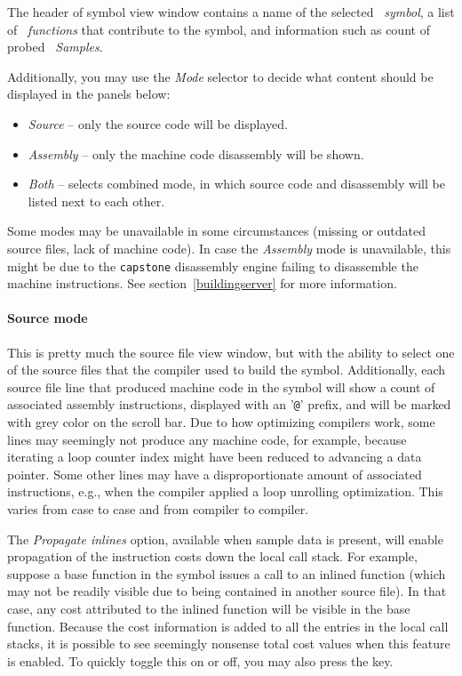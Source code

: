 \documentclass[hidelinks,titlepage,a4paper,twoside]{article}
\begin{document}
The header of symbol view window contains a name of the selected \emph{\faPuzzlePiece{}~symbol}, a list of \emph{\faSitemap{}~functions} that contribute to the symbol, and information such as count of probed \emph{\faEyeDropper{}~Samples}.

Additionally, you may use the \emph{Mode} selector to decide what content should be displayed in the panels below:

\begin{itemize}
\item \emph{Source} -- only the source code will be displayed.
\item \emph{Assembly} -- only the machine code disassembly will be shown.
\item \emph{Both} -- selects combined mode, in which source code and disassembly will be listed next to each other.
\end{itemize}

Some modes may be unavailable in some circumstances (missing or outdated source files, lack of machine code). In case the \emph{Assembly} mode is unavailable, this might be due to the \texttt{capstone} disassembly engine failing to disassemble the machine instructions. See section~\ref{buildingserver} for more information.

\paragraph{Source mode}

This is pretty much the source file view window, but with the ability to select one of the source files that the compiler used to build the symbol. Additionally, each source file line that produced machine code in the symbol will show a count of associated assembly instructions, displayed with an '\texttt{@}' prefix, and will be marked with grey color on the scroll bar. Due to how optimizing compilers work, some lines may seemingly not produce any machine code, for example, because iterating a loop counter index might have been reduced to advancing a data pointer. Some other lines may have a disproportionate amount of associated instructions, e.g., when the compiler applied a loop unrolling optimization. This varies from case to case and from compiler to compiler.

The \emph{Propagate inlines} option, available when sample data is present, will enable propagation of the instruction costs down the local call stack. For example, suppose a base function in the symbol issues a call to an inlined function (which may not be readily visible due to being contained in another source file). In that case, any cost attributed to the inlined function will be visible in the base function. Because the cost information is added to all the entries in the local call stacks, it is possible to see seemingly nonsense total cost values when this feature is enabled. To quickly toggle this on or off, you may also press the  key.
\end{document}
